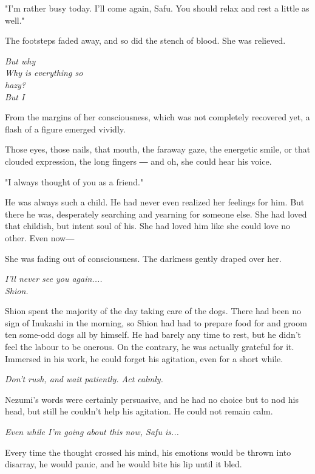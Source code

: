 \myspace

"I'm rather busy today. I'll come again, Safu. You should relax and rest
a little as well."

The footsteps faded away, and so did the stench of blood. She was
relieved.

\myspace

\emph{But why\\
	Why is everything so\\
	hazy?\\
	But I}

\myspace

From the margins of her consciousness, which was not completely
recovered yet, a flash of a figure emerged vividly.

Those eyes, those nails, that mouth, the faraway gaze, the energetic
smile, or that clouded expression, the long fingers ― and oh, she could
hear his voice.

"I always thought of you as a friend."

He was always such a child. He had never even realized her feelings for
him. But there he was, desperately searching and yearning for someone
else. She had loved that childish, but intent soul of his. She had loved
him like she could love no other. Even now―

She was fading out of consciousness. The darkness gently draped over
her.

\myspace

\emph{I'll never see you again....\\
	Shion.}

\myspace

Shion spent the majority of the day taking care of the dogs. There had
been no sign of Inukashi in the morning, so Shion had had to prepare
food for and groom ten some-odd dogs all by himself. He had barely any
time to rest, but he didn't feel the labour to be onerous. On the
contrary, he was actually grateful for it. Immersed in his work, he
could forget his agitation, even for a short while.

\emph{Don't rush, and wait patiently. Act calmly.}

Nezumi's words were certainly persuasive, and he had no choice but to
nod his head, but still he couldn't help his agitation. He could not
remain calm.

\emph{Even while I'm going about this now, Safu is...}

Every time the thought crossed his mind, his emotions would be thrown
into disarray, he would panic, and he would bite his lip until it bled.

